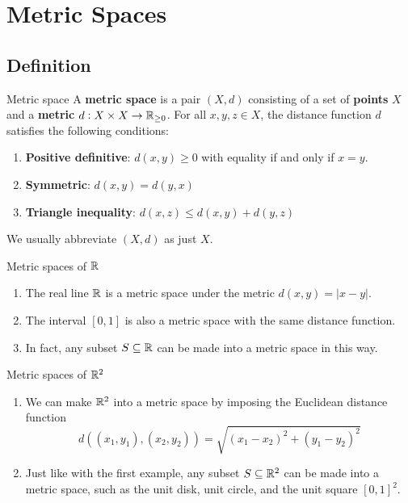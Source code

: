 \chapter{Metric Spaces}
\section{Definition}
\begin{defn}{Metric space}{}
A \textbf{metric space} is a pair $(X,d)$ consisting of a set of \textbf{points} $X$ and a \textbf{metric} $d:X \times X \to \mathbb R_{\ge 0}$. For all $x,y,z \in X$, the distance function $d$ satisfies the following conditions:
\begin{enumerate}[label=\textbf{M\arabic*}]
\item \textbf{Positive definitive}: $d(x,y) \ge 0$ with equality if and only if $x=y$.
\item \textbf{Symmetric}: $d(x,y) = d(y,x)$
\item \textbf{Triangle inequality}: $d(x,z) \le d(x,y) + d(y,z)$
\end{enumerate}
\end{defn}

\begin{notation}
We usually abbreviate $(X,d)$ as just $X$.
\end{notation}

\begin{exmp}{Metric spaces of $\mathbb R$}{} 
\begin{enumerate}[label=(\alph*)]
\item The real line $\mathbb R$ is a metric space under the metric $d(x,y) = |x-y|$.
\item The interval $[0,1]$ is also a metric space with the same distance function.
\item In fact, any subset $S \subseteq \mathbb R$ can be made into a metric space in this way.
\end{enumerate}
\end{exmp}

\begin{exmp}{Metric spaces of $\mathbb R^2$}{} 
\begin{enumerate}[label=(\alph*)]
\item We can make $\mathbb R^2$ into a metric space by imposing the Euclidean distance function
\[ d((x_1, y_1),(x_2, y_2)) = \sqrt{(x_1-x_2)^2+(y_1-y_2)^2} \]
\item Just like with the first example, any subset $S \subseteq \mathbb R^2$ can be made into a metric space, such as the unit disk, unit circle, and the unit square $[0,1]^2$.
\end{enumerate}
\end{exmp}

